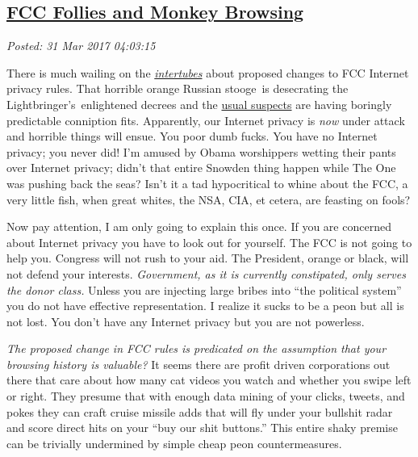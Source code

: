 %

\subsection*{\href{http://analyzethedatanotthedrivel.org/2017/03/30/fcc-follies-and-monkey-browsing/}{FCC Follies and Monkey Browsing}}


\noindent\emph{Posted: 31 Mar 2017 04:03:15}
\vspace{6pt}

There is much wailing on the
\href{http://www.urbandictionary.com/define.php?term=intertubes}{\emph{intertubes}} about
proposed changes to FCC Internet privacy rules. That horrible orange
Russian stooge~is desecrating the Lightbringer's~enlightened decrees and
the
\href{https://www.washingtonpost.com/news/the-switch/wp/2017/03/28/republicans-are-poised-to-roll-back-landmark-fcc-privacy-rules-heres-what-you-need-to-know/}{usual
suspects} are having boringly predictable conniption fits. Apparently,
our Internet privacy is \emph{now} under attack and horrible things will
ensue. You poor dumb fucks. You have no Internet privacy; you never did!
I'm amused by Obama worshippers wetting their pants over Internet
privacy; didn't that entire Snowden thing happen while The One was
pushing back the seas? Isn't it a tad hypocritical to whine about the
FCC, a very little fish, when great whites, the NSA, CIA, et cetera, are
feasting on fools?

Now pay attention, I am only going to explain this once. If you are
concerned about Internet privacy you have to look out for yourself. The
FCC is not going to help you. Congress will not rush to your aid. The
President, orange or black, will not defend your interests.
\emph{Government, as it is currently constipated, only serves the donor
class.} Unless you are injecting large bribes into ``the political
system'' you do not have effective representation. I realize it sucks to
be a peon but all is not lost. You don't have any Internet privacy but
you are not powerless.

\emph{The proposed change in FCC rules is predicated on the assumption
that your browsing history is valuable?} It seems there are profit
driven corporations out there that care about how many cat videos you
watch and whether you swipe left or right. They presume that with enough
data mining of your clicks, tweets, and pokes they can craft cruise
missile adds that will fly under your bullshit radar and score direct
hits on your ``buy our shit buttons.'' This entire shaky premise can be
trivially undermined by simple cheap peon countermeasures.


